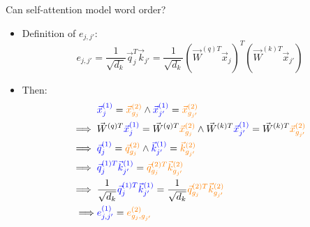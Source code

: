 
\begin{vbframe}{Can self-attention model word order?}

\vfill

\begin{itemize}
\item Definition of $e_{j,j'}$:
$$e_{j,j'} = \frac{1}{\sqrt{d_k}} \vec q_{j}^T \vec k_{j'} = \frac{1}{\sqrt{d_k}} (\vec W^{(q)T} \vec x_{j})^T (\vec W^{(k)T} \vec x_{j'})$$
\item Then:
$$
\begin{aligned}
& \textcolor{blue}{\vec x^{(1)}_j} = \textcolor{orange}{\vec x^{(2)}_{g_j}} \land \textcolor{blue}{\vec x^{(1)}_{j'}} = \textcolor{orange}{\vec x^{(2)}_{g_{j'}}} \\
\implies{} & \vec W^{(q)T} \textcolor{blue}{\vec x^{(1)}_j} = \vec W^{(q)T} \textcolor{orange}{\vec x^{(2)}_{g_j}} \land \vec W^{(k)T} \textcolor{blue}{\vec x^{(1)}_{j'}} = \vec W^{(k)T} \textcolor{orange}{\vec x^{(2)}_{g_{j'}}} \\
\implies{} & \textcolor{blue}{\vec q^{(1)}_j} = \textcolor{orange}{\vec q^{(2)}_{g_j}} \land \textcolor{blue}{\vec k^{(1)}_{j'}} = \textcolor{orange}{\vec k^{(2)}_{g_{j'}}} \\
\implies{} & \textcolor{blue}{\vec q^{(1)T}_j \vec k^{(1)}_{j'}} = \textcolor{orange}{\vec q^{(2)T}_{g_j} \vec k^{(2)}_{g_{j'}}} \\
\implies{} & \frac{1}{\sqrt{d_k}} \textcolor{blue}{\vec q^{(1)T}_j \vec k^{(1)}_{j'}} =  \frac{1}{\sqrt{d_k}}  \textcolor{orange}{\vec q^{(2)T}_{g_j} \vec k^{(2)}_{g_{j'}}} \\
\implies & \textcolor{blue}{e^{(1)}_{j,j'}} = \textcolor{orange}{e^{(2)}_{g_j, g_{j'}}}
\end{aligned}
$$
\end{itemize}

\vfill

\end{vbframe}


